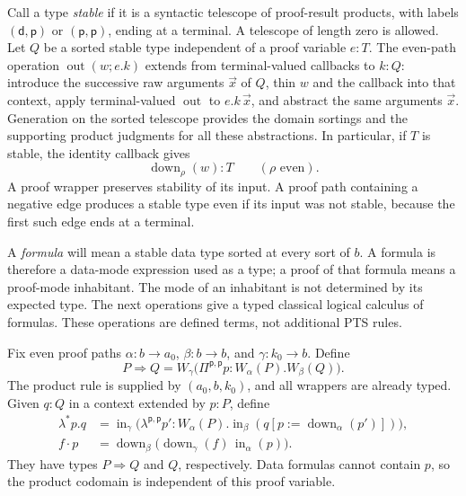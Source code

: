 Call a type \emph{stable} if it is a syntactic telescope of proof-result
products, with labels $(\mathsf d,\mathsf p)$ or
$(\mathsf p,\mathsf p)$, ending at a terminal.  A telescope of length
zero is allowed.  Let $Q$ be a sorted stable type independent of a proof
variable $e:T$.  The even-path operation $\operatorname{out}(w;e.k)$
extends from terminal-valued callbacks to $k:Q$: introduce the successive
raw arguments $\vec x$ of $Q$, thin $w$ and the callback into that
context, apply terminal-valued $\operatorname{out}$ to
$e.k\,\vec x$, and abstract the same arguments $\vec x$.
Generation on the sorted telescope provides the domain sortings and the
supporting product judgments for all these abstractions.  In particular,
if $T$ is stable, the identity callback gives
\[
                    \operatorname{down}_\rho(w):T
                 \qquad (\rho\text{ even}).
\]
A proof wrapper preserves stability of its input.  A proof path containing
a negative edge produces a stable type even if its input was not stable,
because the first such edge ends at a terminal.

A \emph{formula} will mean a stable data type sorted at every sort of
$b$. A formula is therefore a data-mode expression used as a type; a proof
of that formula means a proof-mode inhabitant. The mode of an inhabitant
is not determined by its expected type.  The next operations give a typed classical logical calculus of
formulas.  These operations are defined terms, not additional PTS rules.

Fix even proof paths $\alpha:b\to a_0$, $\beta:b\to b$, and
$\gamma:k_0\to b$.  Define
\[
 P\Rightarrow Q=
 W_\gamma\bigl(\Pi^{\mathsf p,\mathsf p}p:W_\alpha(P).
                                      W_\beta(Q)\bigr).
\]
The product rule is supplied by $(a_0,b,k_0)$, and all wrappers are
already typed.  Given $q:Q$ in a context extended by $p:P$, define
\begin{align*}
 \lambda^*p.q
   &=\operatorname{in}_\gamma\bigl(
       \lambda^{\mathsf p,\mathsf p}p':W_\alpha(P).
       \operatorname{in}_\beta(q[p:=\operatorname{down}_\alpha(p')])
                                      \bigr),\\
 f\cdot p
   &=\operatorname{down}_\beta\bigl(
       \operatorname{down}_\gamma(f)\,
                          \operatorname{in}_\alpha(p)\bigr).
\end{align*}
They have types $P\Rightarrow Q$ and $Q$, respectively.  Data formulas
cannot contain $p$, so the product codomain is independent of this proof
variable.

